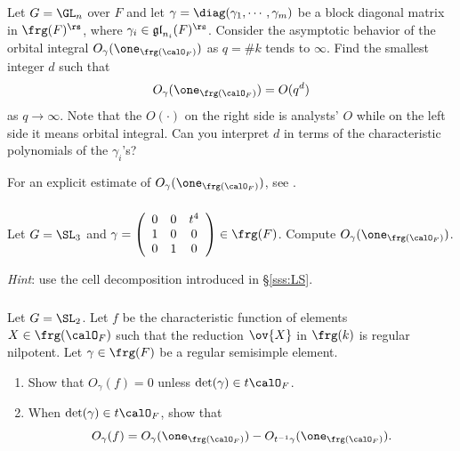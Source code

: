 \subsubsection{} Let $G=\GL_{n}$ over $F$ and let $\gamma=\diag(\gamma_{1},\cdots,\gamma_{m})$ be a block diagonal matrix in $\frg(F)^{\rs}$, where $\gamma_{i}\in\mathfrak{gl}_{n_{i}}(F)^{\rs}$. Consider the asymptotic behavior of the orbital integral $O_{\gamma}(\one_{\frg(\calO_{F})})$  as $q=\#k$ tends to $\infty$. Find the smallest integer $d$ such that
\begin{equation*}
O_{\gamma}(\one_{\frg(\calO_{F})})=O(q^{d})
\end{equation*}
as $q\to\infty$. Note that the $O(\cdot)$ on the right side is analysts' $O$ while on the left side it means orbital integral.  Can you interpret $d$ in terms of the characteristic polynomials of the $\gamma_{i}$'s? 

For an explicit estimate of $O_{\gamma}(\one_{\frg(\calO_{F})})$, see \cite{Y-Orb}.



\subsubsection{} Let $G=\SL_{3}$ and $\gamma=\left(\begin{array}{ccc} 0 & 0 & t^{4}\\ 1 & 0 & 0 \\ 0 & 1& 0 \end{array}\right)\in\frg(F)$. Compute $O_{\gamma}(\one_{\frg(\calO_{F})})$. 

{\em Hint}: use the cell decomposition introduced in \S\ref{sss:LS}.
 
 
\subsubsection{} Let $G=\SL_{2}$. Let $f$ be the characteristic function of elements $X\in\frg(\calO_{F})$ such that the reduction $\ov{X}$ in $\frg(k)$ is regular nilpotent. Let $\gamma\in\frg(F)$ be a regular semisimple element.  
\begin{enumerate}
\item Show that $O_{\gamma}(f)=0$ unless $\det(\gamma)\in t\calO_{F}$.
\item When $\det(\gamma)\in t\calO_{F}$, show that
\begin{equation*}
O_{\gamma}(f)=O_{\gamma}(\one_{\frg(\calO_{F})})-O_{t^{-1}\gamma}(\one_{\frg(\calO_{F})}).
\end{equation*}
\end{enumerate}

